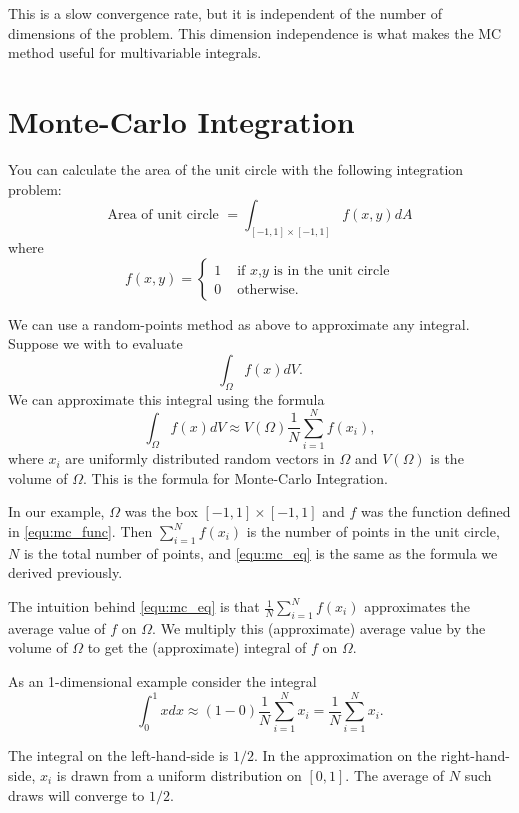 This is a slow convergence rate, but it is independent of the number of dimensions of the problem. 
This dimension independence is what makes the MC method useful for multivariable integrals.

\section*{Monte-Carlo Integration}

You can calculate the area of the unit circle with the following integration problem:
\[
\mbox{Area of unit circle } = \int_{[-1,1]\times[-1,1]} f(x,y) dA
\]
where
\begin{equation}\label{equ:mc_func}
f(x,y) = \begin{cases} 1 &\mbox{ if $x$,$y$ is in the unit circle} \\ 0 &\mbox{ otherwise.} \end{cases}
\end{equation}

We can use a random-points method as above to approximate any integral.
Suppose we with to evaluate
\[
\int_\Omega f(x) dV.
\]
We can approximate this integral using the formula
\begin{equation}\label{equ:mc_eq}
\int_\Omega f(x) dV \approx V(\Omega) \frac{1}{N} \sum_{i=1}^N f(x_i),
\end{equation}
where $x_i$ are uniformly distributed random vectors in $\Omega$ and $V(\Omega)$ is the volume of $\Omega$.
This is the formula for Monte-Carlo Integration. 


In our example, $\Omega$ was the box $[-1,1] \times [-1,1]$ and $f$ was the function defined in \eqref{equ:mc_func}.
Then $\sum_{i=1}^N f(x_i)$ is the number of points in the unit circle, $N$ is the total number of points, and \eqref{equ:mc_eq} is the same as the formula we derived previously.

The intuition behind \eqref{equ:mc_eq} is that $\frac{1}{N} \sum_{i=1}^N f(x_i)$ approximates the average value of $f$ on $\Omega$.
We multiply this (approximate) average value by the volume of $\Omega$ to get the (approximate) integral of $f$ on $\Omega$.

As an 1-dimensional example consider the integral 
\[
\int_0^1 x dx \approx (1-0)\frac{1}{N} \sum_{i=1}^N x_i=\frac{1}{N} \sum_{i=1}^N x_i.
\]

The integral on the left-hand-side is $1/2$. 
In the approximation on the right-hand-side, $x_i$ is drawn from a uniform distribution on $[0,1]$. 
The average of $N$ such draws will converge to $1/2$. 


